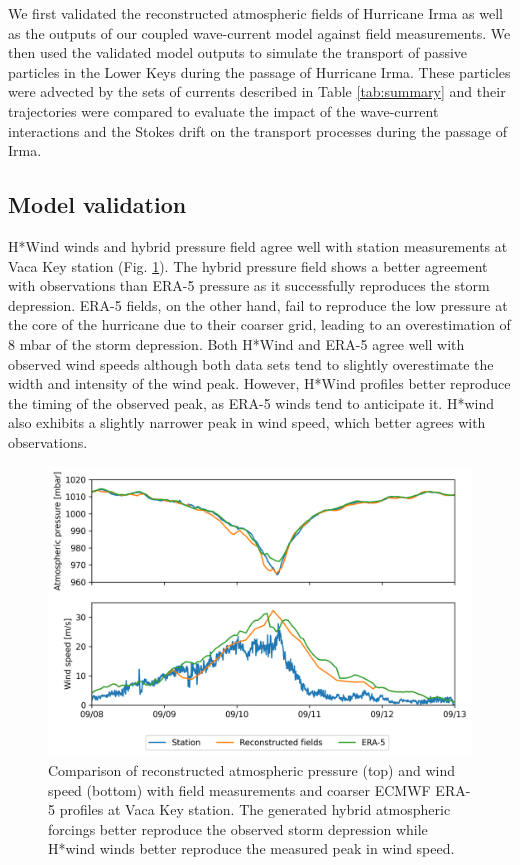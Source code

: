 We first validated the reconstructed atmospheric fields of Hurricane Irma as well as the outputs of our coupled wave-current model against field measurements. We then used the validated model outputs to simulate the transport of passive particles in the Lower Keys during the passage of Hurricane Irma. These particles were advected by the sets of currents described in Table \ref{tab:summary} and their trajectories were compared to evaluate the impact of the wave-current interactions and the Stokes drift on the transport processes during the passage of Irma.

\subsection{Model validation}

H*Wind winds and hybrid pressure field agree well with station measurements at Vaca Key station (Fig. \ref{fig:forcings}). The hybrid pressure field shows a better agreement with observations than ERA-5 pressure as it successfully reproduces the storm depression. ERA-5 fields, on the other hand, fail to reproduce the low pressure at the core of the hurricane due to their coarser grid, leading to an overestimation of 8 mbar of the storm depression. Both H*Wind and ERA-5 agree well with observed wind speeds although both data sets tend to slightly overestimate the width and intensity of the wind peak. However, H*Wind profiles better reproduce the timing of the observed peak, as ERA-5 winds tend to anticipate it. H*wind also exhibits a slightly narrower peak in wind speed, which better agrees with observations.

\begin{figure}
    \centering
    \includegraphics[width=.95\textwidth]{chapters/irma/figures/validation_met_2.png}
    \caption{Comparison of reconstructed atmospheric pressure (top) and wind speed (bottom) with field measurements and coarser ECMWF ERA-5 profiles at Vaca Key station. The generated hybrid atmospheric forcings better reproduce the observed storm depression while H*wind winds better reproduce the measured peak in wind speed.}
    \label{fig:forcings}
\end{figure}

